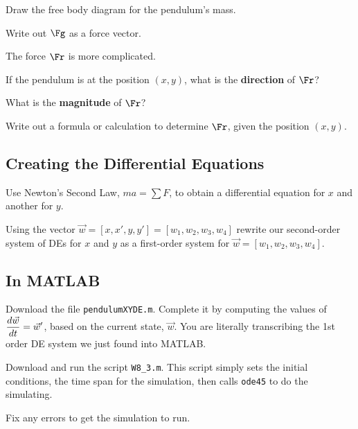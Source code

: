 \problem Draw the free body diagram for the pendulum's mass.
\vfill \vfill

\problem Write out $\Fg$ as a force vector.
\vfill

\newpage
The force $\Fr$ is more complicated.

\problem If the pendulum is at the position $(x, y)$, what is the
  {\bf direction} of $\Fr$?

\vfill

\problem What is the {\bf magnitude} of $\Fr$?

\vfill
\vfill

\newpage 

\problem Write out a formula or calculation to determine $\Fr$,
  given the position $(x, y)$.

\vfill

\newpage


\subsection*{Creating the Differential Equations}

\problem Use Newton's Second Law, $ma = \sum F$, to obtain a
  differential equation for $x$ and another for $y$.

\vfill

\newpage

\problem Using the vector $\vec{w} = [x, x', y, y'] = [w_1, w_2,
  w_3, w_4]$ rewrite our second-order system of DEs for $x$ and $y$ as
  a first-order system for $\vec{w} = [w_1, w_2, w_3, w_4]$.

\vfill
\vfill
\vfill

\newpage

\subsection*{In MATLAB}
\problem Download the file \texttt{pendulumXYDE.m}.  Complete it by
  computing the values of $\displaystyle \frac{d\vec{w}}{dt} = \vec{w}'$, based
    on the current state, $\vec{w}$.  You are literally transcribing
    the 1st order DE system we just found into MATLAB.

\vsc

\problem Download and run the script \texttt{W8\_3.m}. 
This script simply sets the initial conditions, the time span
for the simulation, then calls \texttt{ode45} to do the simulating.

\vsc

\problem Fix any errors to get the simulation to run.

